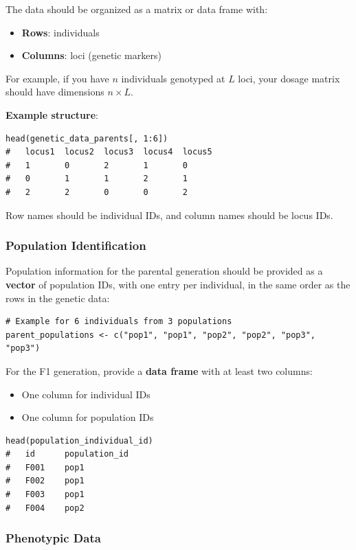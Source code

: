 \documentclass[11pt]{article}
\begin{document}
The data should be organized as a matrix or data frame with:
\begin{itemize}
\item \textbf{Rows}: individuals
\item \textbf{Columns}: loci (genetic markers)
\end{itemize}

For example, if you have $n$ individuals genotyped at $L$ loci, your dosage matrix should have dimensions $n \times L$.

\textbf{Example structure}:
\begin{lstlisting}
head(genetic_data_parents[, 1:6])
#   locus1  locus2  locus3  locus4  locus5
#   1       0       2       1       0
#   0       1       1       2       1
#   2       2       0       0       2
\end{lstlisting}

Row names should be individual IDs, and column names should be locus IDs.

\subsubsection{Population Identification}

Population information for the parental generation should be provided as a \textbf{vector} of population IDs, with one entry per individual, in the same order as the rows in the genetic data:

\begin{lstlisting}
# Example for 6 individuals from 3 populations
parent_populations <- c("pop1", "pop1", "pop2", "pop2", "pop3", "pop3")
\end{lstlisting}

For the F1 generation, provide a \textbf{data frame} with at least two columns:
\begin{itemize}
\item One column for individual IDs
\item One column for population IDs
\end{itemize}

\begin{lstlisting}
head(population_individual_id)
#   id      population_id
#   F001    pop1
#   F002    pop1  
#   F003    pop1
#   F004    pop2
\end{lstlisting}

\subsubsection{Phenotypic Data}
\end{document}
